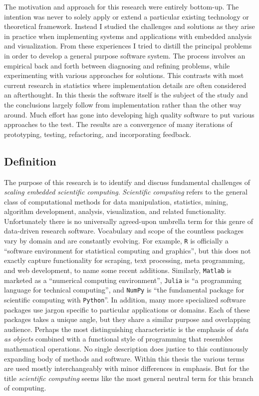 The motivation and approach for this research were entirely bottom-up. The intention was never to solely apply or extend a particular existing technology or theoretical framework. Instead I studied the challenges and solutions as they arise in practice when implementing systems and applications with embedded analysis and visualization. From these experiences I tried to distill the principal problems in order to develop a general purpose software system. The process involves an empirical back and forth between diagnosing and refining problems, while experimenting with various approaches for solutions. This contrasts with most current research in statistics where implementation details are often considered an afterthought. In this thesis the software itself is the subject of the study and the conclusions largely follow from implementation rather than the other way around. Much effort has gone into developing high quality software to put various approaches to the test. The results are a convergence of many iterations of prototyping, testing, refactoring, and incorporating feedback. 


\subsection{Definition}

The purpose of this research is to identify and discuss fundamental challenges of \emph{scaling embedded scientific computing}. \emph{Scientific computing} refers to the general class of computational methods for data manipulation, statistics, mining, algorithm development, analysis, visualization, and related functionality. Unfortunately there is no universally agreed-upon umbrella term for this genre of data-driven research software. Vocabulary and scope of the countless packages vary by domain and are constantly evolving. For example, \texttt{R} is officially a ``software environment for statistical computing and graphics'', but this does not exactly capture functionality for scraping, text processing, meta programming, and web development, to name some recent additions. Similarly, \texttt{Matlab} is marketed as a ``numerical computing environment'', \texttt{Julia} is ``a programming language for technical computing'', and \texttt{NumPy} is ``the fundamental package for scientific computing with \texttt{Python}''. In addition, many more specialized software packages use jargon specific to particular applications or domains. Each of these packages takes a unique angle, but they share a similar purpose and overlapping audience. Perhaps the most distinguishing characteristic is the emphasis of \emph{data as objects} combined with a functional style of programming that resembles mathematical operations. No single description does justice to this continuously expanding body of methods and software. Within this thesis the various terms are used mostly interchangeably with minor differences in emphasis. But for the title \emph{scientific computing} seems like the most general neutral term for this branch of computing.

